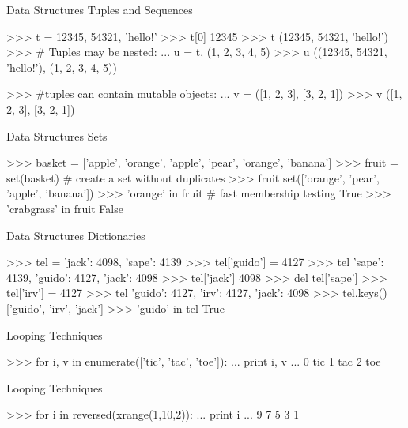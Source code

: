 \documentclass[11pt]{beamer}
\begin{document}
\begin{frame}[containsverbatim]{Data Structures}
Tuples and Sequences
\begin{python}
>>> t = 12345, 54321, 'hello!'
>>> t[0]
12345
>>> t
(12345, 54321, 'hello!')
>>> # Tuples may be nested:
... u = t, (1, 2, 3, 4, 5)
>>> u
((12345, 54321, 'hello!'), (1, 2, 3, 4, 5))

>>> #tuples can contain mutable objects:
... v = ([1, 2, 3], [3, 2, 1])
>>> v
([1, 2, 3], [3, 2, 1])
\end{python}
\end{frame}


\begin{frame}[containsverbatim]{Data Structures}
Sets
\begin{python}
>>> basket = ['apple', 'orange', 'apple', 'pear', 'orange', 'banana']
>>> fruit = set(basket)       # create a set without duplicates
>>> fruit
set(['orange', 'pear', 'apple', 'banana'])
>>> 'orange' in fruit                 # fast membership testing
True
>>> 'crabgrass' in fruit
False

\end{python}
\end{frame}


\begin{frame}[containsverbatim]{Data Structures}
Dictionaries
\begin{python}
>>> tel = {'jack': 4098, 'sape': 4139}
>>> tel['guido'] = 4127
>>> tel
{'sape': 4139, 'guido': 4127, 'jack': 4098}
>>> tel['jack']
4098
>>> del tel['sape']
>>> tel['irv'] = 4127
>>> tel
{'guido': 4127, 'irv': 4127, 'jack': 4098}
>>> tel.keys()
['guido', 'irv', 'jack']
>>> 'guido' in tel
True
\end{python}
\end{frame}


\begin{frame}[containsverbatim]{Looping Techniques}
\begin{python}
>>> for i, v in enumerate(['tic', 'tac', 'toe']):
...    print i, v
...
0 tic
1 tac
2 toe
\end{python}
\end{frame}

\begin{frame}[containsverbatim]{Looping Techniques}
\begin{python}
>>> for i in reversed(xrange(1,10,2)):
...    print i
...
9
7
5
3
1
\end{python}
\end{frame}
\end{document}
